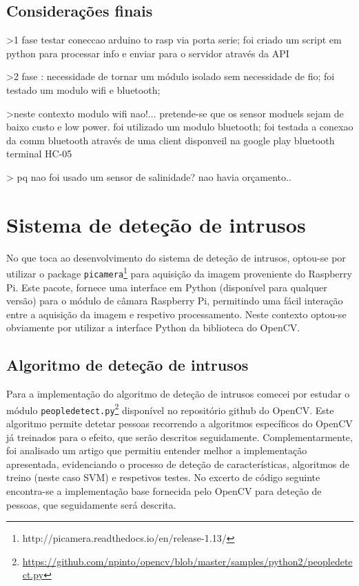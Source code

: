 \subsection{Considerações finais}


>1 fase testar coneccao arduino to rasp via porta serie; foi criado um script em python para processar info e enviar para o servidor através da API 

>2 fase : necessidade de tornar um módulo isolado sem necessidade de fio; foi testado um modulo wifi e bluetooth; 

>neste contexto modulo wifi nao!... pretende-se que os sensor moduels sejam de baixo custo e low power. foi utilizado um modulo bluetooth; foi testada a conexao da comm bluetooth através de uma client disponveil na google play bluetooth terminal HC-05 


> 
pq nao foi usado um sensor de salinidade? nao havia orçamento.. 









\newpage
\section{Sistema de deteção de intrusos}





No que toca ao desenvolvimento do sistema de deteção de intrusos, optou-se por utilizar o package \texttt{picamera}\footnote{http://picamera.readthedocs.io/en/release-1.13/} para aquisição da imagem proveniente do Raspberry Pi. Este pacote, fornece  uma interface em Python (disponível para qualquer versão) para o módulo de câmara Raspberry Pi, permitindo uma fácil interação entre a aquisição da imagem e respetivo processamento. Neste contexto optou-se obviamente por utilizar a interface Python da biblioteca do OpenCV.



\subsection{Algoritmo de deteção de intrusos}


Para a implementação do algoritmo de deteção de intrusos comecei por estudar o módulo \texttt{peopledetect.py}\footnote{\url{https://github.com/npinto/opencv/blob/master/samples/python2/peopledetect.py}} disponível no repositório github do OpenCV. Este algoritmo permite detetar pessoas recorrendo a algoritmos específicos do OpenCV já treinados para o efeito, que serão descritos seguidamente. Complementarmente, foi analisado um artigo\cite{Dalal} que permitiu entender melhor a implementação apresentada, evidenciando o processo de deteção de características, algoritmos de treino (neste caso \ac{SVM}) e respetivos testes. No excerto de código seguinte encontra-se a implementação base fornecida pelo OpenCV para deteção de pessoas, que seguidamente será descrita. 

